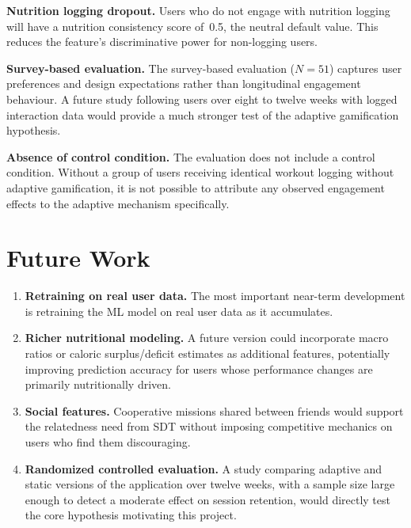 \documentclass[12pt, a4paper]{report}
\begin{document}
\textbf{Nutrition logging dropout.} Users who do not engage with nutrition logging will have a nutrition consistency score of~0.5, the neutral default value. This reduces the feature's discriminative power for non-logging users.

\textbf{Survey-based evaluation.} The survey-based evaluation (\(N = 51\)) captures user preferences and design expectations rather than longitudinal engagement behaviour. A future study following users over eight to twelve weeks with logged interaction data would provide a much stronger test of the adaptive gamification hypothesis.

\textbf{Absence of control condition.} The evaluation does not include a control condition. Without a group of users receiving identical workout logging without adaptive gamification, it is not possible to attribute any observed engagement effects to the adaptive mechanism specifically.

\section{Future Work}

\begin{enumerate}
  \item \textbf{Retraining on real user data.} The most important near-term development is retraining the ML model on real user data as it accumulates.
  \item \textbf{Richer nutritional modeling.} A future version could incorporate macro ratios or caloric surplus/deficit estimates as additional features, potentially improving prediction accuracy for users whose performance changes are primarily nutritionally driven.
  \item \textbf{Social features.} Cooperative missions shared between friends would support the relatedness need from SDT without imposing competitive mechanics on users who find them discouraging.
  \item \textbf{Randomized controlled evaluation.} A study comparing adaptive and static versions of the application over twelve weeks, with a sample size large enough to detect a moderate effect on session retention, would directly test the core hypothesis motivating this project.
\end{enumerate}


\end{document}
